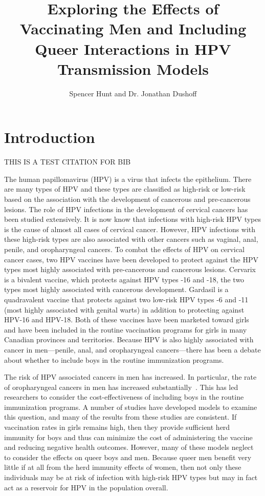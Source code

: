 \documentclass[12pt]{article}
\title{Exploring the Effects of Vaccinating Men and Including Queer Interactions in HPV Transmission Models}
\author{Spencer Hunt and Dr. Jonathan Dushoff}
\begin{document}
\maketitle

\section{Introduction}

THIS IS A TEST CITATION FOR BIB~\cite{Hello}

The human papillomavirus (HPV) is a virus that infects the epithelium.  There are many types of HPV and these types are classified as high-risk or low-risk based on the association with the development of cancerous and pre-cancerous lesions.  The role of HPV infections in the development of cervical cancers has been studied extensively.  It is now know that infections with high-risk HPV types is the cause of almost all cases of cervical cancer.  However, HPV infections with these high-risk types are also associated with other cancers such as vaginal, anal, penile, and oropharyngeal cancers.  To combat the effects of HPV on cervical cancer cases, two HPV vaccines have been developed to protect against the HPV types most highly associated with pre-cancerous and cancerous lesions. Cervarix is a bivalent vaccine, which protects against HPV types -16 and -18, the two types most highly associated with cancerous development.  Gardasil is a quadravalent vaccine that protects against two low-risk HPV types -6 and -11 (most highly associated with genital warts) in addition to protecting against HPV-16 and HPV-18.  Both of these vaccines have been marketed toward girls and have been included in the routine vaccination programs for girls in many Canadian provinces and territories.  Because HPV is also highly associated with cancer in men---penile, anal, and oropharyngeal cancers---there has been a debate about whether to include boys in the routine immunization programs.  

The risk of HPV associated cancers in men has increased. In particular, the rate of oropharyngeal cancers in men has increased substantially~\cite{}.  This has led researchers to consider the cost-effectiveness of including boys in the routine immunization programs.  A number of studies have developed models to examine this question, and many of the results from these studies are consistent.  If vaccination rates in girls remains high, then they provide sufficient herd immunity for boys and thus can minimize the cost of administering the vaccine and reducing negative health outcomes.  However, many of these models neglect to consider the effects on queer boys and men.  Because queer men benefit very little if at all from the herd immunity effects of women, then not only these individuals may be at risk of infection with high-risk HPV types but may in fact act as a reservoir for HPV in the population overall.  
\end{document}
